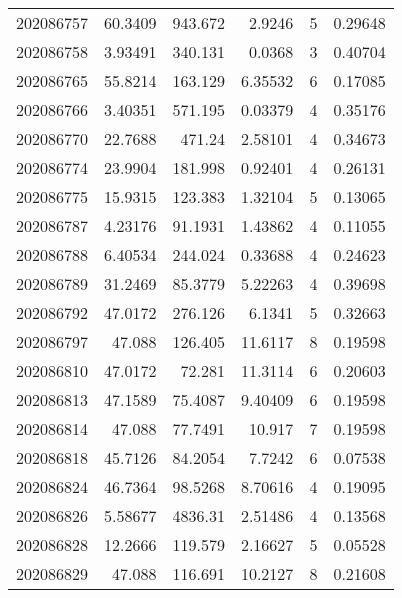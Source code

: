\begin{tabular}{rrrrrr}
 202086757 &         60.3409  &      943.672  &            2.9246  &           5 & 0.29648 \\
 202086758 &          3.93491 &      340.131  &            0.0368  &           3 & 0.40704 \\
 202086765 &         55.8214  &      163.129  &            6.35532 &           6 & 0.17085 \\
 202086766 &          3.40351 &      571.195  &            0.03379 &           4 & 0.35176 \\
 202086770 &         22.7688  &      471.24   &            2.58101 &           4 & 0.34673 \\
 202086774 &         23.9904  &      181.998  &            0.92401 &           4 & 0.26131 \\
 202086775 &         15.9315  &      123.383  &            1.32104 &           5 & 0.13065 \\
 202086787 &          4.23176 &       91.1931 &            1.43862 &           4 & 0.11055 \\
 202086788 &          6.40534 &      244.024  &            0.33688 &           4 & 0.24623 \\
 202086789 &         31.2469  &       85.3779 &            5.22263 &           4 & 0.39698 \\
 202086792 &         47.0172  &      276.126  &            6.1341  &           5 & 0.32663 \\
 202086797 &         47.088   &      126.405  &           11.6117  &           8 & 0.19598 \\
 202086810 &         47.0172  &       72.281  &           11.3114  &           6 & 0.20603 \\
 202086813 &         47.1589  &       75.4087 &            9.40409 &           6 & 0.19598 \\
 202086814 &         47.088   &       77.7491 &           10.917   &           7 & 0.19598 \\
 202086818 &         45.7126  &       84.2054 &            7.7242  &           6 & 0.07538 \\
 202086824 &         46.7364  &       98.5268 &            8.70616 &           4 & 0.19095 \\
 202086826 &          5.58677 &     4836.31   &            2.51486 &           4 & 0.13568 \\
 202086828 &         12.2666  &      119.579  &            2.16627 &           5 & 0.05528 \\
 202086829 &         47.088   &      116.691  &           10.2127  &           8 & 0.21608 \\

\end{tabular}
